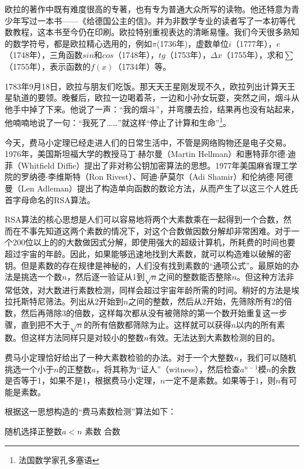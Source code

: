\documentclass{article}
\begin{document}
欧拉的著作中既有难度很高的专著，也有专为普通大众所写的读物。他还特意为青少年写过一本书——《给德国公主的信》。并为非数学专业的读者写了一本初等代数教程，这本书至今仍在印刷。欧拉特别重视表达的清晰易懂。我们今天很多熟知的数学符号，都是欧拉精心选用的，例如$\pi$(1736年)，虚数单位$i$（1777年），$e$（1748年），三角函数$sin$和$cos$（1748年），$tg$（1753年），$\Delta x$（1755年），求和$\sum$（1755年），表示函数的$f(x)$（1734年）等\cite{HanXueTao2009}。

1783年9月18日，欧拉与朋友们吃饭。那天天王星刚发现不久，欧拉列出计算天王星轨道的要领。晚餐后，欧拉一边喝着茶，一边和小孙女玩耍，突然之间，烟斗从他手中掉了下来。他说了一声：“我的烟斗”，并弯腰去捡，结果再也没有站起来，他喃喃地说了一句：“我死了……”就这样“停止了计算和生命”\footnote{法国数学家孔多塞语}。

\vspace{5mm}

今天，费马小定理已经走进人们的日常生活中，不管是网络购物还是电子交易。1976年，美国斯坦福大学的教授马丁$\cdot$赫尔曼（Martin Hellman）和惠特菲尔德$\cdot$迪菲（Whitfield Diffie）提出了非对称公钥加密算法的思想。1977年美国麻省理工学院的罗纳德$\cdot$李维斯特（Ron Rivest）、阿迪$\cdot$萨莫尔（Adi Shamir）和伦纳德$\cdot$阿德曼（Len Adleman）提出了构造单向函数的数论方法，从而产生了以这三个人姓氏首字母命名的RSA算法。

RSA算法的核心思想是人们可以容易地将两个大素数乘在一起得到一个合数，然而在不事先知道这两个素数的情况下，对这个合数做因数分解却非常困难。对于一个200位以上的的大数做因式分解，即使用强大的超级计算机，所耗费的时间也要超过宇宙的年龄。因此，如果能够迅速地找到大素数，就可以构造难以破解的密钥。但是素数的存在规律是神秘的，人们没有找到素数的“通项公式”。最原始的办法是挑选一个数$n$，然后逐一验证从1到$\sqrt{n}$之间的整数能否整除$n$。但这种方法非常低效，对大数进行素数检测，同样会超过宇宙年龄所需的时间。稍好的方法是埃拉托斯特尼筛法。列出从2开始到$n$之间的整数，然后从2开始，先筛除所有2的倍数，然后再筛除3的倍数，这样每次都从没有被筛除的第一个数开始重复这一步骤，直到把不大于$\sqrt{n}$的所有倍数都筛除为止。这样就可以获得$n$以内的所有素数。但这样方法同样只是对较小的整数$n$有效。无法达到大素数检测的目的。

费马小定理恰好给出了一种大素数检验的办法。对于一个大整数$n$，我们可以随机挑选一个小于$n$的正整数$a$，将其称为“证人”（witness），然后检查$a^{n-1}$模$n$的余数是否等于1，如果不是1，根据费马小定理，$n$一定不是素数。如果等于1，则$n$有可能是素数。

根据这一思想构造的“费马素数检测”算法如下：

\begin{algorithmic}
  \State 随机选择正整数$a < n$
    \State \Return 素数
  \Else
    \State \Return 合数
  \EndIf
\EndFunction
\end{algorithmic}
\end{document}

